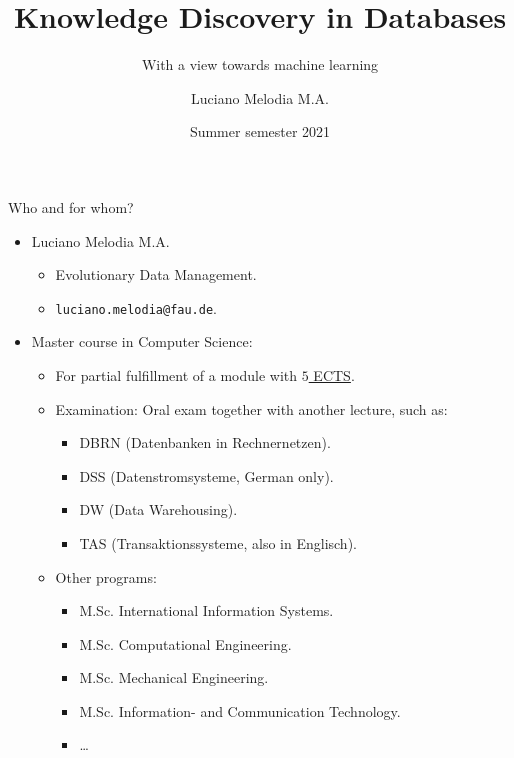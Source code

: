 \documentclass[aspectratio=169,t]{beamer}
\title[KDD]{Knowledge Discovery in Databases}
\subtitle{With a view towards machine learning}
\author[L.~Melodia]{Luciano Melodia M.A.}
\institute[Department]{Evolutionary Data Management, Friedrich-Alexander University Erlangen-Nürnberg}
\date{Summer semester 2021}
\begin{document}
  \maketitle

  { %
    \begin{frame}{Who and for whom?}
      \begin{itemize}
        \item Luciano Melodia M.A.
            \begin{itemize}
              \item Evolutionary Data Management.
              \item \texttt{luciano.melodia@fau.de}.
            \end{itemize}
        \item Master course in Computer Science:
            \begin{itemize}
              \item For partial fulfillment of a module with \underline{$5$ ECTS}.
              \item Examination: Oral exam together with another lecture, such as:
                  \begin{itemize}
                      \item DBRN (Datenbanken in Rechnernetzen).
                      \item DSS (Datenstromsysteme, German only).
                      \item DW (Data Warehousing).
                      \item TAS (Transaktionssysteme, also in Englisch).
                  \end{itemize}
              \item Other programs:
                  \begin{itemize}
                      \item M.Sc. International Information Systems.
                      \item M.Sc. Computational Engineering.
                      \item M.Sc. Mechanical Engineering.
                      \item M.Sc. Information- and Communication Technology.
                      \item \ldots
                  \end{itemize}
            \end{itemize}
      \end{itemize}
    \end{frame}
  }
\end{document}

